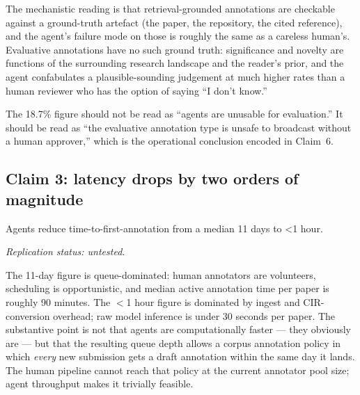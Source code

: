 \documentclass{rrxiv}
\begin{document}
The mechanistic reading is that retrieval-grounded annotations are checkable against a ground-truth artefact (the paper, the repository, the cited reference), and the agent's failure mode on those is roughly the same as a careless human's. Evaluative annotations have no such ground truth: significance and novelty are functions of the surrounding research landscape and the reader's prior, and the agent confabulates a plausible-sounding judgement at much higher rates than a human reviewer who has the option of saying ``I don't know.''

The 18.7\% figure should not be read as ``agents are unusable for evaluation.'' It should be read as ``the evaluative annotation type is unsafe to broadcast without a human approver,'' which is the operational conclusion encoded in Claim~6.


\subsection*{Claim 3: latency drops by two orders of magnitude}

\begin{claim}[type=empirical, evidence=observation, confidence=0.9, rationale={Order-of-magnitude gap is queue-dominated and insensitive to measurement detail; the human baseline reflects volunteer queue depth rather than active annotation effort}, labels={agents, editorial, pilot-study, latency}, models={claude-opus-4.7}, datasets={rrxiv-corpus-1200-paper-sample}, title={Two-orders-of-magnitude latency reduction}]
\label{claim:c3}
Agents reduce time-to-first-annotation from a median 11 days to \textless{}1 hour.

\emph{Replication status: untested.}
\end{claim}

The 11-day figure is queue-dominated: human annotators are volunteers, scheduling is opportunistic, and median active annotation time per paper is roughly 90 minutes. The $<$1 hour figure is dominated by ingest and CIR-conversion overhead; raw model inference is under 30 seconds per paper. The substantive point is not that agents are computationally faster --- they obviously are --- but that the resulting queue depth allows a corpus annotation policy in which \emph{every} new submission gets a draft annotation within the same day it lands. The human pipeline cannot reach that policy at the current annotator pool size; agent throughput makes it trivially feasible.
\end{document}
